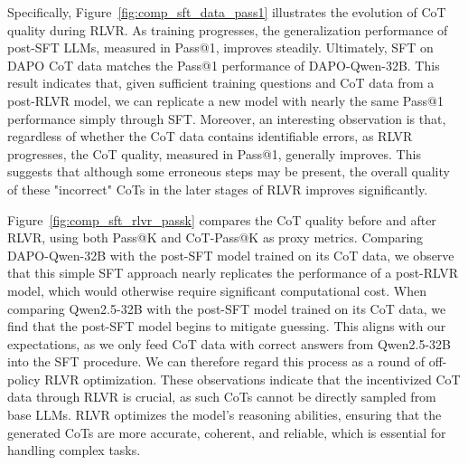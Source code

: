 Specifically, Figure~\ref{fig:comp_sft_data_pass1} illustrates the evolution of CoT quality during RLVR. As training progresses, the generalization performance of post-SFT LLMs, measured in Pass@1, improves steadily. Ultimately, SFT on DAPO CoT data matches the Pass@1 performance of DAPO-Qwen-32B. This result indicates that, given sufficient training questions and CoT data from a post-RLVR model, we can replicate a new model with nearly the same Pass@1 performance simply through SFT.
Moreover, an interesting observation is that, regardless of whether the CoT data contains identifiable errors, as RLVR progresses, the CoT quality, measured in Pass@1, generally improves. This suggests that although some erroneous steps may be present, the overall quality of these "incorrect" CoTs in the later stages of RLVR improves significantly.

Figure~\ref{fig:comp_sft_rlvr_passk} compares the CoT quality before and after RLVR, using both Pass@K and CoT-Pass@K as proxy metrics. Comparing DAPO-Qwen-32B with the post-SFT model trained on its CoT data, we observe that this simple SFT approach nearly replicates the performance of a post-RLVR model, which would otherwise require significant computational cost. When comparing Qwen2.5-32B with the post-SFT model trained on its CoT data, we find that the post-SFT model begins to mitigate guessing. This aligns with our expectations, as we only feed CoT data with correct answers from Qwen2.5-32B into the SFT procedure. We can therefore regard this process as a round of off-policy RLVR optimization.
These observations indicate that the incentivized CoT data through RLVR is crucial, as such CoTs cannot be directly sampled from base LLMs. RLVR optimizes the model's reasoning abilities, ensuring that the generated CoTs are more accurate, coherent, and reliable, which is essential for handling complex tasks.


